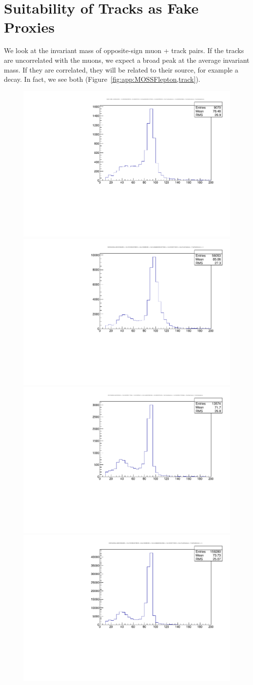 \chapter{Suitability of Tracks as Fake Proxies}
\label{app:MOSSFlepton,track}

We look at the invariant mass of opposite-sign muon + track pairs. If the tracks are uncorrelated with the muons, we expect a broad peak at the average invariant mass. If they are correlated, they will be related to their source, for example a \Z decay. In fact, we see both (Figure~\ref{fig:app:MOSSFlepton,track}).

\begin{figure}
\begin{center}
	\includegraphics[width=.5\textwidth]{Appendix/study_OSSFCLOSEMLL_electron,track_1fake}%
	\includegraphics[width=.5\textwidth]{Appendix/study_OSSFCLOSEMLL_electron,track_dileptons-1fake}\\
	\includegraphics[width=.5\textwidth]{Appendix/study_OSSFCLOSEMLL_muon,track_1fake}%
	\includegraphics[width=.5\textwidth]{Appendix/study_OSSFCLOSEMLL_muon,track_dileptons-1fake}

\end{center}
\end{figure}
